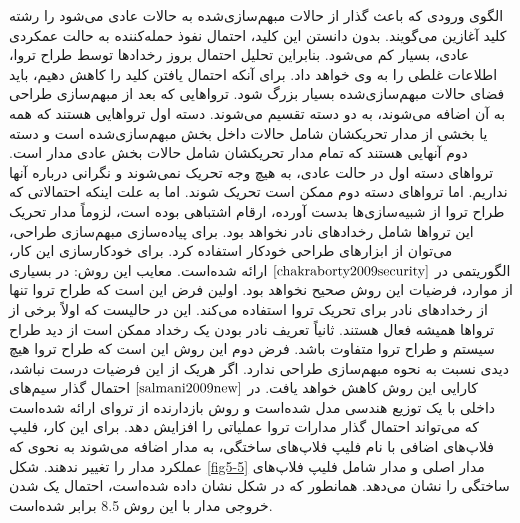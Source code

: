 الگوی ورودی که باعث گذار از حالات مبهم‌سازی‌شده به حالات عادی می‌شود را رشته کلید آغازین می‌گویند. بدون دانستن این کلید، احتمال نفوذ حمله‌کننده به حالت عمکردی عادی، بسیار کم می‌شود. بنابراین تحلیل احتمال بروز رخدادها توسط طراح تروا، اطلاعات غلطی را به وی خواهد داد. برای آنکه احتمال یافتن کلید را کاهش دهیم، باید فضای حالات مبهم‌سازی‌شده بسیار بزرگ شود. تروا‌هایی که بعد از مبهم‌سازی طراحی به آن اضافه می‌شوند، به دو دسته تقسیم می‌شوند. دسته اول تروا‌هایی هستند که همه یا بخشی از مدار تحریکشان شامل حالات داخل بخش مبهم‌سازی‌شده ‌است و دسته دوم آنهایی هستند که تمام مدار تحریکشان شامل حالات بخش عادی مدار است. تروا‌های دسته اول در حالت عادی، به هیچ وجه تحریک نمی‌شوند و نگرانی درباره آنها نداریم. اما تروا‌های دسته دوم ممکن است تحریک شوند. اما به علت اینکه احتمالاتی که طراح تروا از شبیه‌سازی‌ها بدست آورده، ارقام اشتباهی بوده است، لزوماً مدار تحریک این تروا‌ها شامل رخدادهای نادر نخواهد بود. برای پیاده‌سازی مبهم‌سازی طراحی، می‌توان از ابزارهای طراحی خودکار استفاده کرد. برای خودکارسازی این کار، الگوریتمی در $\cite{chakraborty2009security}$ ارائه شده‌است.
معایب این روش:
در بسیاری از موارد، فرضیات این روش صحیح نخواهد بود. اولین فرض این است که طراح تروا تنها از رخدادهای نادر برای تحریک تروا استفاده می‌کند. این در حالیست که اولاً برخی از تروا‌ها همیشه فعال هستند. ثانیاً تعریف نادر بودن یک رخداد ممکن است از دید طراح سیستم و طراح تروا متفاوت باشد. فرض دوم این روش این است که طراح تروا هیچ دیدی نسبت به نحوه مبهم‌سازی طراحی ندارد. اگر هریک از این فرضیات درست نباشد، کارایی این روش کاهش خواهد یافت.
در $\cite{salmani2009new}$ احتمال گذار سیم‌های داخلی با یک توزیع هندسی مدل شده‌است و روش بازدارنده از تروای ارائه شده‌است که می‌تواند احتمال گذار مدارات تروا عملیاتی را افزایش دهد. برای این کار، فلیپ فلاپ‌های اضافی با نام فلیپ فلاپ‌های ساختگی، به مدار اضافه می‌شوند به نحوی که عملکرد مدار را تغییر ندهند. شکل \ref{fig5-5} مدار اصلی و مدار شامل فلیپ فلاپ‌های ساختگی را نشان می‌دهد. همانطور که در شکل نشان داده شده‌است، احتمال یک شدن خروجی مدار با این روش 8.5 برابر شده‌است.
